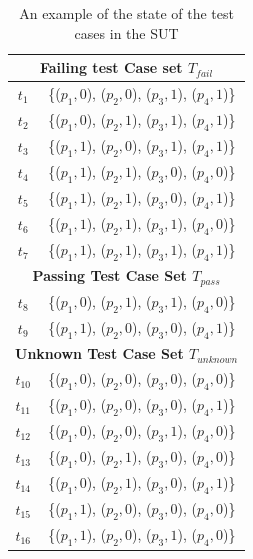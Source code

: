 \begin{table}[htbp]
  \centering
  \caption{An example of the state of the test cases in the SUT}
  \label{ex:determinableschemassut}
    \begin{tabular}{|c|c|} \hline
     \multicolumn{2}{|c|}{\textbf{Failing test Case set $T_{fail}$}} \\ \hline
  $t_{1}$ & \{($p_{1}, 0$), ($p_{2}, 0$), ($p_{3}, 1$), ($p_{4}, 1$)\}\\
  $t_{2}$ & \{($p_{1}, 0$), ($p_{2}, 1$), ($p_{3}, 1$), ($p_{4}, 1$)\}\\
  $t_{3}$ & \{($p_{1}, 1$), ($p_{2}, 0$), ($p_{3}, 1$), ($p_{4}, 1$)\}\\

  $t_{4}$ & \{($p_{1}, 1$), ($p_{2}, 1$), ($p_{3}, 0$), ($p_{4}, 0$)\}\\
  $t_{5}$ & \{($p_{1}, 1$), ($p_{2}, 1$), ($p_{3}, 0$), ($p_{4}, 1$)\}\\
  $t_{6}$ & \{($p_{1}, 1$), ($p_{2}, 1$), ($p_{3}, 1$), ($p_{4}, 0$)\}\\

  $t_{7}$ & \{($p_{1}, 1$), ($p_{2}, 1$), ($p_{3}, 1$), ($p_{4}, 1$)\}\\

  \hline

     \multicolumn{2}{|c|}{\textbf{Passing Test Case Set $T_{pass}$}} \\ \hline
  $t_{8}$ & \{($p_{1}, 0$), ($p_{2}, 1$), ($p_{3}, 1$), ($p_{4}, 0$)\} \\
  $t_{9}$ & \{($p_{1}, 1$), ($p_{2}, 0$), ($p_{3}, 0$), ($p_{4}, 1$)\} \\ \hline
        \multicolumn{2}{|c|}{\textbf{Unknown Test Case Set $T_{unknown}$}} \\ \hline
  $t_{10}$ & \{($p_{1}, 0$), ($p_{2}, 0$), ($p_{3}, 0$), ($p_{4}, 0$)\} \\
  $t_{11}$ & \{($p_{1}, 0$), ($p_{2}, 0$), ($p_{3}, 0$), ($p_{4}, 1$)\} \\
  $t_{12}$ & \{($p_{1}, 0$), ($p_{2}, 0$), ($p_{3}, 1$), ($p_{4}, 0$)\} \\
  $t_{13}$ & \{($p_{1}, 0$), ($p_{2}, 1$), ($p_{3}, 0$), ($p_{4}, 0$)\} \\
  $t_{14}$ & \{($p_{1}, 0$), ($p_{2}, 1$), ($p_{3}, 0$), ($p_{4}, 1$)\} \\
  $t_{15}$ & \{($p_{1}, 1$), ($p_{2}, 0$), ($p_{3}, 0$), ($p_{4}, 0$)\} \\
  $t_{16}$ & \{($p_{1}, 1$), ($p_{2}, 0$), ($p_{3}, 1$), ($p_{4}, 0$)\} \\ \hline
    \end{tabular}%
\end{table}


